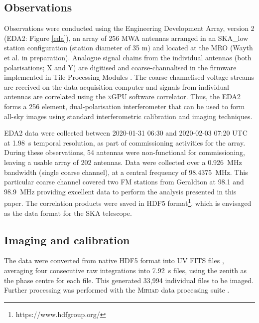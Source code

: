 \subsection{Observations}
\label{subsec:obs}

Observations were conducted using the Engineering Development Array, version 2 (EDA2: Figure \ref{eda}), an array of 256 MWA antennas arranged in an SKA\_low station configuration (station diameter of 35 m) and located at the MRO (Wayth et al. in preparation).  Analogue signal chains from the individual antennas (both polarisations; X and Y) are digitised and coarse-channalised in the firmware \citep{2017JAI.....641015C} implemented in Tile Processing Modules \citep[TPM;][]{2017JAI.....641014N}. The coarse-channelised voltage streams are received on the data acquisition computer and signals from individual antennas are correlated using the \textsc{xGPU} \citep{xGPU} software correlator.  Thus, the EDA2 forms a 256 element, dual-polarisation interferometer that can be used to form all-sky images using standard interferometric calibration and imaging techniques.


EDA2 data were collected between 2020-01-31 06:30 and 2020-02-03 07:20 UTC at \SI{1.98}{\second} temporal resolution, as part of commissioning activities for the array.  During these observations, 54 antennas were non-functional for commissioning, leaving a usable array of 202 antennas.  Data were collected over a \SI{0.926}{\mega\hertz} bandwidth (single coarse channel), at a central frequency of \SI{98.4375}{\mega\hertz}. This particular coarse channel covered two FM stations from Geraldton at 98.1 and \SI{98.9}{\mega\hertz} providing excellent data to perform the analysis presented in this paper. The correlation products were saved in \textsc{HDF5} format\footnote{https://www.hdfgroup.org/}, which is envisaged as the data format for the SKA telescope.

\subsection{Imaging and calibration}
\label{subsec:imcal}

The data were converted from native \textsc{HDF5} format into UV FITS files \citep{uvfits}, averaging four consecutive raw integrations into \SI{7.92}{s} files, using the zenith as the phase centre for each file. This generated 33,994 individual files to be imaged.
Further processing was performed with the \textsc{Miriad} data processing suite \citep{1995ASPC...77..433S}.

